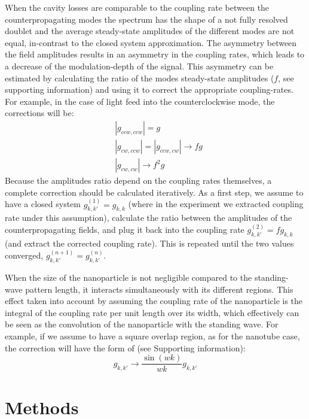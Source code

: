 \documentclass[journal=jacsat,manuscript=article]{achemso}
\begin{document}
When the cavity losses are comparable to the coupling rate between the counterpropagating modes the spectrum has the shape of a not fully resolved doublet and the average steady-state amplitudes of the different modes are not equal, in-contrast to the closed system approximation. The asymmetry between the field amplitudes results in an asymmetry in the coupling rates, which leads to a decrease of the modulation-depth of the signal. This asymmetry can be estimated by calculating the ratio of the modes steady-state amplitudes ($f$, see supporting information) and using it to correct the appropriate coupling-rates. For example, in the case of light feed into the counterclockwise mode, the corrections will be:
\begin{align*}
&\left| g_{ccw,ccw} \right| = g \\
&\left| g_{cw,ccw} \right| = \left| g_{ccw,cw} \right| \rightarrow f g \\
&\left| g_{cw,cw} \right| \rightarrow f^2 g
\end{align*}
Because the amplitudes ratio depend on the coupling rates themselves, a complete correction should be calculated iteratively. As a first step, we assume to have a closed system $g_{k,k'}^{(1)} = g_{k,k}$ (where in the experiment we extracted coupling rate under this assumption), calculate the ratio between the amplitudes of the counterpropagating fields, and plug it back into the coupling rate $g_{k,k'}^{(2)} = fg_{k,k}$ (and extract the corrected coupling rate). This is repeated until the two values converged, $g_{k,k'}^{(n+1)} = g_{k,k'}^{(n)}$.

When the size of the nanoparticle is not negligible compared to the standing-wave pattern length, it interacts simultaneously with its different regions. This effect taken into account by assuming the coupling rate of the nanoparticle is the integral of the coupling rate per unit length over its width, which effectively can be seen as the convolution of the nanoparticle with the standing wave. For example, if we assume to have a square overlap region, as for the nanotube case, the correction will have the form of (see Supporting information):
\begin{equation}
g_{k,k'} \rightarrow \frac{\sin{\left( wk \right)}}{wk} g_{k,k'}
\end{equation}

\section{Methods}
\end{document}
